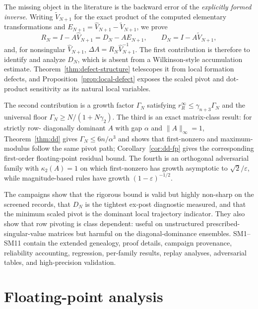 \documentclass[review,onefignum,onetabnum]{siamart251216}
\begin{document}
The missing object in the literature is the backward error of the \emph{explicitly formed inverse}.
Writing $\widetilde V_{N+1}$ for the exact product of the computed elementary transformations and
$E_{N+1}=\widehat V_{N+1}-\widetilde V_{N+1}$, we prove
\begin{equation}\label{eq:intro-decomposition}
R_N=I-A\widehat V_{N+1}=D_N-AE_{N+1},
\qquad
D_N=I-A\widetilde V_{N+1},
\end{equation}
and, for nonsingular $\widehat V_{N+1}$,
$\Delta A=R_N\widehat V_{N+1}^{-1}$.  The first contribution is therefore to identify and analyze
$D_N$, which is absent from a Wilkinson-style accumulation estimate.  Theorem~\ref{thm:defect-structure}
telescopes it from local formation defects, and Proposition~\ref{prop:local-defect} exposes the
scaled pivot and dot-product sensitivity as its natural local variables.

The second contribution is a growth factor $\Gamma_N$ satisfying
$r_R^\infty\le\gamma_{n+3}\Gamma_N$ and the universal floor
$\Gamma_N\ge N/(1+N\gamma_2)$.  The third is an exact matrix-class result: for strictly row-
diagonally dominant $A$ with gap $\alpha$ and $\|A\|_\infty=1$,
Theorem~\ref{thm:dd} gives $\Gamma_N\le6n/\alpha^3$ and shows that first-nonzero and
maximum-modulus follow the same pivot path; Corollary~\ref{cor:dd-fp} gives the corresponding
first-order floating-point residual bound.  The fourth is an orthogonal adversarial family with
$\kappa_2(A)=1$ on which first-nonzero has growth asymptotic to $\sqrt2/\varepsilon$, while
magnitude-based rules have growth $(1-\varepsilon)^{-1/2}$.

The campaigns show that the rigorous bound is valid but highly non-sharp on the screened records,
that $D_N$ is the tightest ex-post diagnostic measured, and that the minimum scaled pivot is the
dominant local trajectory indicator.  They also show that row pivoting is class dependent: useful
on unstructured prescribed-singular-value matrices but harmful on the diagonal-dominance ensembles.
SM1--SM11 contain the extended genealogy, proof details, campaign provenance, reliability
accounting, regression, per-family results, replay analyses, adversarial tables, and high-precision
validation.


\section{Floating-point analysis}
\label{sec:fp}
\end{document}
